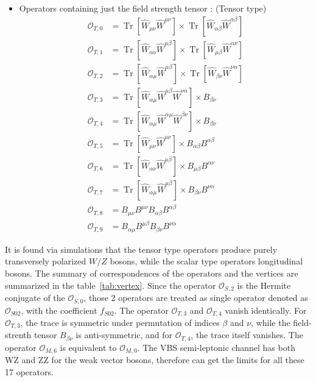 \begin{itemize}
\begin{equation}
\end{equation}
\item Operators containing just the field strength tensor : (Tensor type)
\begin{equation}
\label{eq:OpratorFT}
\begin{aligned}
\mathcal{O}_{T, 0} &=\operatorname{Tr}\left[\hat{W}_{\mu \nu} \hat{W}^{\mu \nu}\right] \times \operatorname{Tr}\left[\hat{W}_{\alpha \beta} \hat{W}^{\alpha \beta}\right] \\
\mathcal{O}_{T, 1} &=\operatorname{Tr}\left[\hat{W}_{\alpha \nu} \hat{W}^{\mu \beta}\right] \times \operatorname{Tr}\left[\hat{W}_{\mu \beta} \hat{W}^{\alpha \nu}\right] \\
\mathcal{O}_{T, 2} &=\operatorname{Tr}\left[\hat{W}_{\alpha \mu} \hat{W}^{\mu \beta}\right] \times \operatorname{Tr}\left[\hat{W}_{\beta \nu} \hat{W}^{\nu \alpha}\right] \\
\mathcal{O}_{T, 3} &=\operatorname{Tr}\left[\hat{W}_{\alpha \mu} \hat{W}^{\mu \beta} \hat{W}^{\nu \alpha}\right] \times B_{\beta \nu} \\
\mathcal{O}_{T, 4} &=\operatorname{Tr}\left[\hat{W}_{\alpha \mu} \hat{W}^{\alpha \mu} \hat{W}^{\beta \nu}\right] \times B_{\beta \nu} \\
\mathcal{O}_{T, 5} &=\operatorname{Tr}\left[\hat{W}_{\mu \nu} \hat{W}^{\mu \nu}\right] \times B_{\alpha \beta} B^{\alpha \beta} \\
\mathcal{O}_{T, 6} &=\operatorname{Tr}\left[\hat{W}_{\alpha \nu} \hat{W}^{\mu \beta}\right] \times B_{\mu \beta} B^{\alpha \nu} \\
\mathcal{O}_{T, 7} &=\operatorname{Tr}\left[\hat{W}_{\alpha \mu} \hat{W}^{\mu \beta}\right] \times B_{\beta \nu} B^{\nu \alpha} \\
\mathcal{O}_{T, 8} &=B_{\mu \nu} B^{\mu \nu} B_{\alpha \beta} B^{\alpha \beta} \\
\mathcal{O}_{T, 9} &=B_{\alpha \mu} B^{\mu \beta} B_{\beta \nu} B^{\nu \alpha}
\end{aligned}
\end{equation}
\end{itemize}

It is found via simulations that the tensor type operators produce purely transversely polarized $W/Z$ bosons, while the scalar type operators longitudinal bosons.
The summary of correspondences of the operators and the vertices are summarized in the table~\ref{tab:vertex}. 
Since the operator $\mathcal{O}_{S, 2}$ is the Hermite conjugate of the $\mathcal{O}_{S, 0}$, those 2 operators are treated as single operator denoted as $\mathcal{O}_{S02}$, with the coefficient $f_{S02}$. 
The operator $\mathcal{O}_{T, 3}$ and $\mathcal{O}_{T, 4}$ vanish identically. For $\mathcal{O}_{T, 3}$, the trace is symmetric under permutation of indices $\beta$ and $\nu$, while the field-strenth tensor $B_{\beta \nu}$ is anti-symmetric, and for $\mathcal{O}_{T, 4}$, the trace itself vanishes.
The operator $\mathcal{O}_{M, 6}$ is equivalent to $\mathcal{O}_{M, 0}$.
The VBS semi-leptonic channel has both WZ and ZZ for the weak vector bosons, therefore can get the limits for all these 17 operators.

